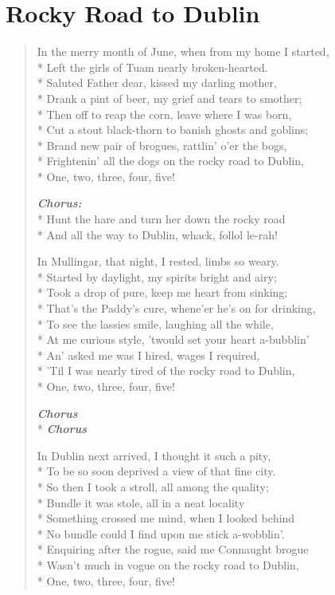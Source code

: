 \documentclass[9pt,twoside]{extarticle}
\makeatletter
\newenvironment{xverse}{
	\begin{verse}
	\fontsize{8.5}{10.5}\selectfont
}{
	\end{verse}
}
\newcommand{\chorusdef}{\textbf{\emph{Chorus:}}\\*}
\newcommand{\chorus@mark}[1][1]{%
\textbf{\emph{Chorus \ifthenelse{\equal{#1}{1}}{}{$\times$ #1}}}%
}
\newcommand{\chorusmark}[1][1]{%
\ifvmode%
\vspace{-0.5\stanzaskip}%
\chorus@mark[#1]%
\vspace{-0.5\stanzaskip}%
\else \\*%
\chorus@mark[#1]%
\fi%
}
\makeatother
\begin{document}
\section{Rocky Road to Dublin}

\begin{xverse}
In the merry month of June, when from my home I started, \\*
Left the girls of Tuam nearly broken-hearted. \\*
Saluted Father dear, kissed my darling mother, \\*
Drank a pint of beer, my grief and tears to smother; \\*
Then off to reap the corn, leave where I was born, \\*
Cut a stout black-thorn to banish ghosts and goblins; \\*
Brand new pair of brogues, rattlin’ o’er the bogs, \\*
Frightenin’ all the dogs on the rocky road to Dublin, \\*
One, two, three, four, five!

\chorusdef
Hunt the hare and turn her down the rocky road \\*
And all the way to Dublin, whack, follol le-rah!

In Mullingar, that night, I rested, limbs so weary. \\*
Started by daylight, my spirits bright and airy; \\*
Took a drop of pure, keep me heart from sinking; \\*
That’s the Paddy’s cure, whene’er he’s on for drinking, \\*
To see the lassies smile, laughing all the while, \\*
At me curious style, ’twould set your heart a-bubblin’ \\*
An’ asked me was I hired, wages I required, \\*
’Til I was nearly tired of the rocky road to Dublin, \\*
One, two, three, four, five!

\chorusmark

In Dublin next arrived, I thought it such a pity, \\*
To be so soon deprived a view of that fine city. \\*
So then I took a stroll, all among the quality; \\*
Bundle it was stole, all in a neat locality \\*
Something crossed me mind, when I looked behind \\*
No bundle could I find upon me stick a-wobblin’. \\*
Enquiring after the rogue, said me Connaught brogue \\*
Wasn’t much in vogue on the rocky road to Dublin, \\*
One, two, three, four, five!


\end{xverse}
\end{document}
